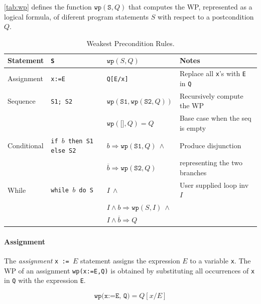 \documentclass[oneside,11pt,dvipsnames]{book}
\renewcommand{\implies}{\Rightarrow}
\newcommand{\code}[1]{\texttt{#1}}
\begin{document}
\autoref{tab:wp} defines the function $\code{wp}(\code{S}, Q)$ that computes the WP, represented as a logical formula, of diferent program statements $S$ with respect to a postcondition $Q$.

\begin{table}
    \caption{Weakest Precondition Rules.}\label{tab:wp}
    \centering
    \footnotesize
\begin{tabular}{l|l|l|l}
\textbf{Statement} & \code{S} & $\code{wp}(S,Q)$ & Notes\\
\midrule
Assignment & \code{x:=E} & \code{Q[E/x]} & Replace all \code{x}'s with \code{E} in \code{Q} \\
\midrule
Sequence & \code{S1; S2} & $\code{wp}(\code{S1}, \code{wp}(\code{S2}, Q))$ & Recursively compute the WP\\
&& $\code{wp}(\code{[]}, Q) = Q$ & Base case when the seq is empty\\
\midrule
Conditional & \code{if $b$ then S1 else S2} & $b \implies \code{wp}(\code{S1},Q)~\land$ & Produce disjunction\\
  & & $\overline{b} \implies \code{wp}(\code{S2},Q)$ & representing the two branches\\
\midrule
While & \code{while $b$ do S} & $I ~\land $ & User supplied loop inv $I$\\
&& $I \land b \implies \code{wp}(S, I) ~\land$ &\\ 
&& $I \land \overline{b} \implies Q$ &\\ 
\bottomrule
\end{tabular}
\end{table}

\paragraph{Assignment} The \emph{assignment} \code{x\ :=\ $E$} statement assigns the expression
$E$ to a variable \code{x}. The WP of an assignment \code{wp(x:=E,Q)} is obtained by substituting all occurrences of
\code{x} in \code{Q} with the expression \code{E}. 

\begin{equation}\label{eq:wp-assign}
    \code{wp(x:=E, Q)} = Q[x/E]
\end{equation}
\end{document}
